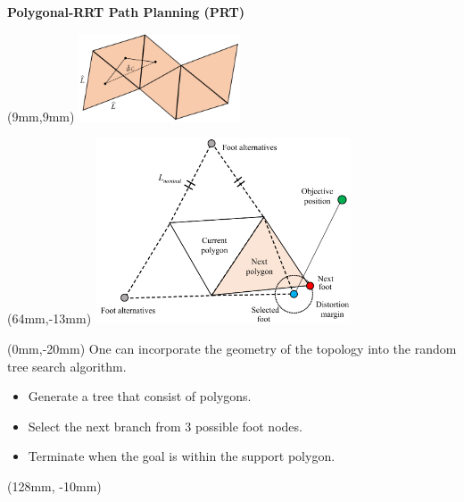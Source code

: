 \documentclass[11pt,aspectratio=169]{beamer}
\begin{document}
\begin{frame}[fragile]{\textbf{Polygonal-RRT Path Planning (PRT)}}
    
        \begin{textblock*}{5cm}(9mm,9mm) %
        \includegraphics[height=26mm]{elements/[15]-PRT.png}
        \end{textblock*}

        \begin{textblock*}{5cm}(64mm,-13mm) %
        \includegraphics[height=55mm]{elements/[14]-PRT.png}
        \end{textblock*}

        \begin{textblock*}{130mm}(0mm,-20mm)
        One can incorporate the geometry of the topology into the random tree search algorithm. 
        \vspace{4.5mm}
        \begin{itemize}
            \item Generate a tree that consist of polygons.
            \item Select the next branch from 3 possible foot nodes.
            \item Terminate when the goal is within the support polygon.
        \end{itemize}
        \end{textblock*}


        \begin{textblock*}{5cm}(128mm, -10mm) %
        {\tiny \cite{bb}}
        \end{textblock*}

\end{frame}
\end{document}
